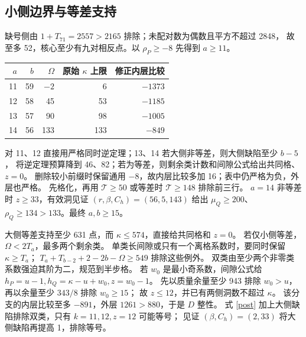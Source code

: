 \documentclass[11pt,a4paper]{article}
\newcommand{\T}{\mathcal T}
\theoremstyle{definition}
\begin{document}
\subsection{小侧边界与等差支持}
缺号侧由 $1+T_{71}=2557>2165$ 排除；未配对数为偶数且平方不超过 2848，
故至多 52，核心至少有九对相反点。以 $\rho_P\ge-8$ 先得到 $a\ge11$。
\begin{center}\begin{tabular}{rrrrr}\toprule
$a$&$b$&$\Omega$&原始 $\kappa$ 上限&修正内层比较\\\midrule
11&59&$-2$&6&$-1373$\\12&58&45&53&$-1185$\\
13&57&90&98&$-1005$\\14&56&133&133&$-849$\\\bottomrule
\end{tabular}\end{center}
对 11、12 直接用严格同时逆定理；13、14 若大侧非等差，则大侧缺陷至少 $b-5$，
将逆定理预算降到 46、82；若为等差，则剩余类计数和间隙公式给出共同格、$z=0$。
删除较小前缀时保留通用 $-8$，故内层比较多加 16；表中仍严格为负，外层也严格。
先格化，再用 $\T\ge50$ 或等差时 $\T\ge148$ 排除前三行。
$a=14$ 非等差时 $z\ge33$，有效洞见证 $(r,\beta,C_h)=(56,5,143)$
给出 $\mu_Q\ge200$、$\rho_Q\ge134>133$。最终 $a,b\ge15$。

大侧等差支持至少 631 点，而 $\kappa\le574$，直接给共同格和 $z=0$。
若仅小侧等差，$\Omega<2T_a$，最多两个剩余类。
单类长间隙或只有一个离格系数时，要同时保留 $\kappa\ge T_a$；
$T_a+T_{b-2}+2-2b-\Omega\ge549$ 排除这些例外。
双类由至少两个非零类系数强迫其阶为二，规范到半步格。
若 $w_0$ 是最小奇系数，间隙公式给
$h_P=u-1,h_Q=\kappa-u+w_0,z=w_0-1$。
先以质量余量至少 943 排除 $w_0>u$，再以余量至少 $343/8$ 排除 $w_0\ge15$；
故 $z\le12$，并已有两侧洞数不超过 $\kappa$。
该分支的内层比较至多 $-891$，外层 $1261>880$，于是 $D$ 整性。
式 \eqref{post} 加上大侧缺陷排除双类，只有 $k=11,12,z=12$ 可能等号；
见证 $(\beta,C_h)=(2,33)$ 将大侧缺陷再提高 1，排除等号。
\end{document}
